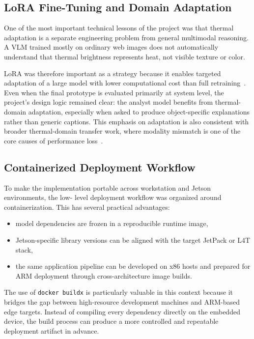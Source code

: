 \subsection{LoRA Fine-Tuning and Domain Adaptation}

One of the most important technical lessons of the project was that thermal adaptation is a
separate engineering problem from general multimodal reasoning. A VLM trained mostly on
ordinary web images does not automatically understand that thermal brightness represents
heat, not visible texture or color.

LoRA was therefore important as a strategy because it enables targeted adaptation of a large
model with lower computational cost than full retraining~\cite{lora}. Even when the final
prototype is evaluated primarily at system level, the project's design logic remained clear:
the analyst model benefits from thermal-domain adaptation, especially when asked to produce
object-specific explanations rather than generic captions. This emphasis on adaptation is also
consistent with broader thermal-domain transfer work, where modality mismatch is one of the
core causes of performance loss~\cite{sstn2021}.

\subsection{Containerized Deployment Workflow}

To make the implementation portable across workstation and Jetson environments, the low-
level deployment workflow was organized around containerization. This has several practical
advantages:

\begin{itemize}[nosep]
  \item model dependencies are frozen in a reproducible runtime image,
  \item Jetson-specific library versions can be aligned with the target JetPack or L4T stack,
  \item the same application pipeline can be developed on x86 hosts and prepared for ARM
    deployment through cross-architecture image builds.
\end{itemize}

The use of \texttt{docker buildx} is particularly valuable in this context because it bridges the
gap between high-resource development machines and ARM-based edge targets. Instead of
compiling every dependency directly on the embedded device, the build process can produce a
more controlled and repeatable deployment artifact in advance.

